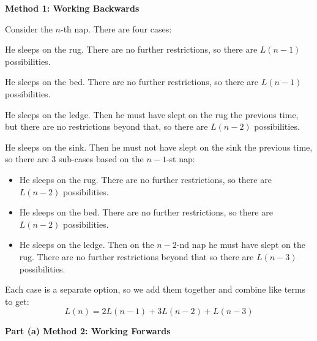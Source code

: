 \documentclass[12pt]{exam}
\begin{document}
\begin{solution}
\begin{qparts}
    \item \textbf{Method 1: Working Backwards}
    
    Consider the $n$-th nap. There are four cases:
    \begin{qsubparts}
        \item He sleeps on the rug. There are no further restrictions, so there are $L(n-1)$ possibilities.
        \item He sleeps on the bed. There are no further restrictions, so there are $L(n-1)$ possibilities.
        \item He sleeps on the ledge. Then he must have slept on the rug the previous time, but there are no restrictions beyond that, so there are $L(n-2)$ possibilities.
        \item He sleeps on the sink. Then he must not have slept on the sink the previous time, so there are 3 sub-cases based on the $n-1$-st nap:
        \begin{itemize}
            \item He sleeps on the rug. There are no further restrictions, so there are $L(n-2)$ possibilities.
            \item He sleeps on the bed. There are no further restrictions, so there are $L(n-2)$ possibilities.
            \item He sleeps on the ledge. Then on the $n-2$-nd nap he must have slept on the rug. There are no further restrictions beyond that so there are $L(n-3)$ possibilities.
        \end{itemize}
    \end{qsubparts}
    Each case is a separate option, so we add them together and combine like terms to get:
    $$L(n) = 2L(n-1) + 3L(n-2) + L(n-3)$$
    
    \textbf{Part (a) Method 2: Working Forwards}
    

\end{qparts}
\end{solution}
\end{document}
